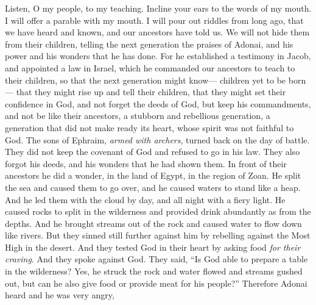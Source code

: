 \begin{biblechapter} %
 Listen, O my people, to my teaching. 
Incline your ears to the words of my mouth.
\verse I will offer a parable with my mouth. 
I will pour out riddles from long ago,
\verse that we have heard and known, 
and our ancestors have told us.
\verse We will not hide them from their children, 
telling the next generation the praises of Adonai, 
and his power and his wonders that he has done.
\verse For he established a testimony in Jacob, 
and appointed a law in Israel, 
which he commanded our ancestors 
to teach to their children,
\verse so that the next generation might know— 
children yet to be born— 
that they might rise up and tell their children,
\verse that they might set their confidence in God, 
and not forget the deeds of God, 
but keep his commandments,
\verse and not be like their ancestors, 
a stubborn and rebellious generation, 
a generation that did not make ready its heart, 
whose spirit was not faithful to God.
\verse The sons of Ephraim, \textit{armed with archers}, 
turned back on the day of battle.
\verse They did not keep the covenant of God 
and refused to go in his law.
\verse They also forgot his deeds, 
and his wonders that he had shown them.
\verse In front of their ancestors he did a wonder, 
in the land of Egypt, in the region of Zoan.
\verse He split the sea and caused them to go over, 
and he caused waters to stand like a heap.
\verse And he led them with the cloud by day, 
and all night with a fiery light.
\verse He caused rocks to split in the wilderness 
and provided drink abundantly as from the depths.
\verse And he brought streams out of the rock 
and caused water to flow down like rivers.
\verse But they sinned still further against him 
by rebelling against the Most High in the desert.
\verse And they tested God in their heart 
by asking food \textit{for their craving}.
\verse And they spoke against God. 
They said, “Is God able 
to prepare a table in the wilderness?
\verse Yes, he struck the rock and water flowed 
and streams gushed out, 
but can he also give food 
or provide meat for his people?”
\verse Therefore Adonai heard 
and he was very angry, 

\end{biblechapter}
